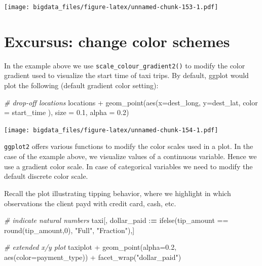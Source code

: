 \documentclass[
  12pt,
]{style/krantz}
\newenvironment{Shaded}{\begin{snugshade}}{\end{snugshade}}
\newcommand{\AttributeTok}[1]{\textcolor[rgb]{0.77,0.63,0.00}{#1}}
\newcommand{\CommentTok}[1]{\textcolor[rgb]{0.56,0.35,0.01}{\textit{#1}}}
\newcommand{\DecValTok}[1]{\textcolor[rgb]{0.00,0.00,0.81}{#1}}
\newcommand{\ErrorTok}[1]{\textcolor[rgb]{0.64,0.00,0.00}{\textbf{#1}}}
\newcommand{\FloatTok}[1]{\textcolor[rgb]{0.00,0.00,0.81}{#1}}
\newcommand{\FunctionTok}[1]{\textcolor[rgb]{0.00,0.00,0.00}{#1}}
\newcommand{\NormalTok}[1]{#1}
\newcommand{\SpecialCharTok}[1]{\textcolor[rgb]{0.00,0.00,0.00}{#1}}
\newcommand{\StringTok}[1]{\textcolor[rgb]{0.31,0.60,0.02}{#1}}
\begin{document}
\texttt{[image: bigdata\_files/figure-latex/unnamed-chunk-153-1.pdf]}

\hypertarget{excursus-change-color-schemes}{%
\section{Excursus: change color schemes}\label{excursus-change-color-schemes}}

In the example above we use \texttt{scale\_colour\_gradient2()} to modify the color gradient used to visualize the start time of taxi trips. By default, ggplot would plot the following (default gradient color setting):

\begin{Shaded}
\begin{Highlighting}[]
\CommentTok{\# drop{-}off locations }
\NormalTok{locations }\SpecialCharTok{+}
     \FunctionTok{geom\_point}\NormalTok{(}\FunctionTok{aes}\NormalTok{(}\AttributeTok{x=}\NormalTok{dest\_long, }\AttributeTok{y=}\NormalTok{dest\_lat, }\AttributeTok{color =}\NormalTok{ start\_time ),}
                \AttributeTok{size =} \FloatTok{0.1}\NormalTok{,}
                \AttributeTok{alpha =} \FloatTok{0.2}\NormalTok{) }
\end{Highlighting}
\end{Shaded}

\texttt{[image: bigdata\_files/figure-latex/unnamed-chunk-154-1.pdf]}

\texttt{ggplot2} offers various functions to modify the color scales used in a plot. In the case of the example above, we visualize values of a continuous variable. Hence we use a gradient color scale. In case of categorical variables we need to modify the default discrete color scale.

Recall the plot illustrating tipping behavior, where we highlight in which observations the client payd with credit card, cash, etc.

\begin{Shaded}
\begin{Highlighting}[]
\CommentTok{\# indicate natural numbers}
\NormalTok{taxi[, dollar\_paid }\SpecialCharTok{:}\ErrorTok{=} \FunctionTok{ifelse}\NormalTok{(tip\_amount }\SpecialCharTok{==} \FunctionTok{round}\NormalTok{(tip\_amount,}\DecValTok{0}\NormalTok{), }\StringTok{"Full"}\NormalTok{, }\StringTok{"Fraction"}\NormalTok{),]}


\CommentTok{\# extended x/y plot}
\NormalTok{taxiplot }\SpecialCharTok{+}
     \FunctionTok{geom\_point}\NormalTok{(}\AttributeTok{alpha=}\FloatTok{0.2}\NormalTok{, }\FunctionTok{aes}\NormalTok{(}\AttributeTok{color=}\NormalTok{payment\_type)) }\SpecialCharTok{+}
     \FunctionTok{facet\_wrap}\NormalTok{(}\StringTok{"dollar\_paid"}\NormalTok{)}
\end{Highlighting}
\end{Shaded}
\end{document}
